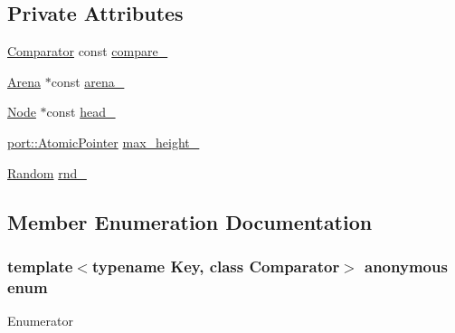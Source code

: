 \subsection*{Private Attributes}
\begin{DoxyCompactItemize}
\item 
\hyperlink{structleveldb_1_1_comparator}{Comparator} const \hyperlink{classleveldb_1_1_skip_list_ab59a01d670b82316fd0532c17cb45a37}{compare\+\_\+}
\item 
\hyperlink{classleveldb_1_1_arena}{Arena} $\ast$const \hyperlink{classleveldb_1_1_skip_list_ae5eb0912ac01174439bc009ab74e366c}{arena\+\_\+}
\item 
\hyperlink{structleveldb_1_1_skip_list_1_1_node}{Node} $\ast$const \hyperlink{classleveldb_1_1_skip_list_abe0e7aa843a469bf63d1d1c9b64582f0}{head\+\_\+}
\item 
\hyperlink{classleveldb_1_1port_1_1_atomic_pointer}{port\+::\+Atomic\+Pointer} \hyperlink{classleveldb_1_1_skip_list_a08b97b9da8e1fd93d2c6ae4915dc132f}{max\+\_\+height\+\_\+}
\item 
\hyperlink{classleveldb_1_1_random}{Random} \hyperlink{classleveldb_1_1_skip_list_ae418eb7ce6b8e0a4ea95b8b782e02c9e}{rnd\+\_\+}
\end{DoxyCompactItemize}


\subsection{Member Enumeration Documentation}
\hypertarget{classleveldb_1_1_skip_list_a2e64dde7e3a6df57e1b4a43ff4ab0ef8}{}\subsubsection[{anonymous enum}]{\setlength{\rightskip}{0pt plus 5cm}template$<$typename Key, class Comparator$>$ anonymous enum\hspace{0.3cm}{\ttfamily [private]}}\label{classleveldb_1_1_skip_list_a2e64dde7e3a6df57e1b4a43ff4ab0ef8}
\begin{Desc}
\item[Enumerator]\par
\begin{description}
\item[{\em 
\hypertarget{classleveldb_1_1_skip_list_a2e64dde7e3a6df57e1b4a43ff4ab0ef8a60ca280962bbbc6e8055b14fb11a81b5}{}k\+Max\+Height\label{classleveldb_1_1_skip_list_a2e64dde7e3a6df57e1b4a43ff4ab0ef8a60ca280962bbbc6e8055b14fb11a81b5}
}]\end{description}
\end{Desc}


